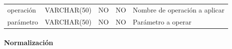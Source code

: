 \documentclass[12pt,a4paperpaper,]{report}
\let\oldparagraph\paragraph
\renewcommand{\paragraph}[1]{\oldparagraph{#1}\mbox{}}
\begin{document}
\begin{longtable}[]{@{}lllll@{}}
\begin{minipage}[t]{0.21\columnwidth}\raggedright\strut
operación\strut
\end{minipage} & \begin{minipage}[t]{0.19\columnwidth}\raggedright\strut
VARCHAR(50)\strut
\end{minipage} & \begin{minipage}[t]{0.16\columnwidth}\raggedright\strut
NO\strut
\end{minipage} & \begin{minipage}[t]{0.19\columnwidth}\raggedright\strut
NO\strut
\end{minipage} & \begin{minipage}[t]{0.11\columnwidth}\raggedright\strut
Nombre de operación a aplicar\strut
\end{minipage}\tabularnewline
\begin{minipage}[t]{0.21\columnwidth}\raggedright\strut
parámetro\strut
\end{minipage} & \begin{minipage}[t]{0.19\columnwidth}\raggedright\strut
VARCHAR(50)\strut
\end{minipage} & \begin{minipage}[t]{0.16\columnwidth}\raggedright\strut
NO\strut
\end{minipage} & \begin{minipage}[t]{0.19\columnwidth}\raggedright\strut
NO\strut
\end{minipage} & \begin{minipage}[t]{0.11\columnwidth}\raggedright\strut
Parámetro a operar\strut
\end{minipage}\tabularnewline
\bottomrule
\end{longtable}

\paragraph{Normalización}\label{normalizaciuxf3n-11}
\end{document}
